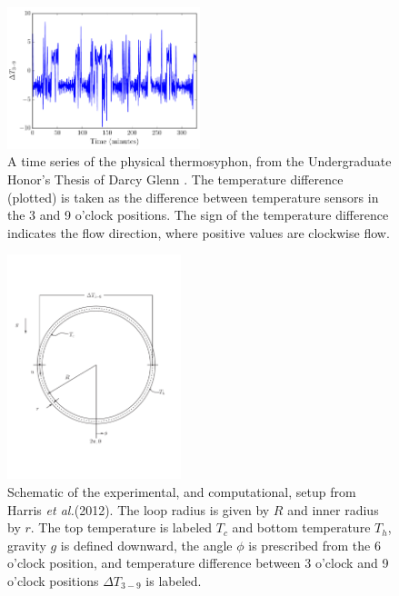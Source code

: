 \documentclass[pre,twocolumn,twoside,byrevtex,superscriptaddress]{revtex4}
\newcommand{\etal}{\textit{et al.}}
\begin{document}
\begin{figure}[h]
  \centering
  \includegraphics[width=0.5\textwidth]{fig01_2015-09-30-12-26-221-timeseries.pdf}
  \caption[A time series of the physical thermosyphon, from the Undergraduate Honor's Thesis of Darcy Glenn {\protect \cite{glenn2013}}]{
    A time series of the physical thermosyphon, from the Undergraduate Honor's Thesis of Darcy Glenn {\protect \cite{glenn2013}}.
    The temperature difference (plotted) is taken as the difference between temperature sensors in the 3 and 9 o'clock positions.
    The sign of the temperature difference indicates the flow direction, where positive values are clockwise flow.
      }
  \label{fig:thermosyphon-physical-timeseries}
\end{figure}

\begin{figure}[h]
  \centering
  \includegraphics[width=0.45\textwidth]{fig02_harris-tellus-2012-loop.pdf}
  \caption[Schematic of the experimental, and computational, setup from Harris \etal (2012)]{
    Schematic of the experimental, and computational, setup from Harris \etal (2012).
    The loop radius is given by $R$ and inner radius by $r$.
    The top temperature is labeled $T_c$ and bottom temperature $T_h$, gravity $g$ is defined downward, the angle $\phi$ is prescribed from the 6 o'clock position, and temperature difference between 3 o'clock and 9 o'clock positions $\Delta T_{3-9}$ is labeled.
  }
  \label{fig:thermosyphon-schematic}
\end{figure}
\end{document}
